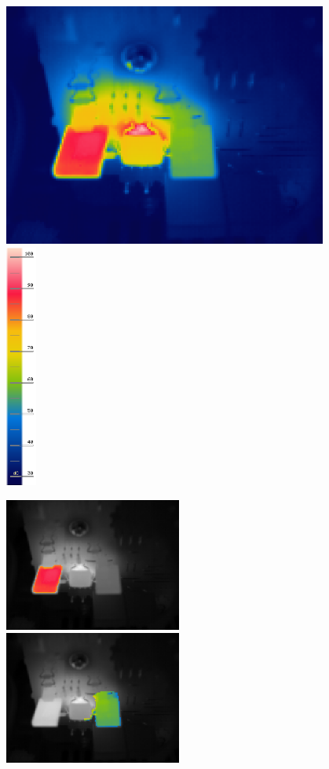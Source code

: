 \documentclass[a4paper,twoside,notitlepage]{article}
\begin{document}
\begin{figure}[hptb!]
 \centering
 \includegraphics[height=8cm, keepaspectratio=true]{img_report/IR_6357}
 \includegraphics[height=8cm, keepaspectratio=true]{img_report/IR_6357_scale}

 \vspace*{2mm}
 \includegraphics[height=4.36cm, keepaspectratio=true]{img_report/q7009}
 \includegraphics[height=4.36cm, keepaspectratio=true]{img_report/q7007}


\end{figure}
\end{document}
